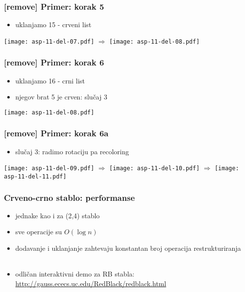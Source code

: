 \documentclass[compress,aspectratio=169]{beamer}
\begin{document}
\begin{frame}[fragile]
  \frametitle{[remove] Primer: korak 5}
  \begin{itemize}
    \item uklanjamo 15 - crveni list
  \end{itemize}
  \begin{center}
    \texttt{[image: asp-11-del-07.pdf]} $\Rightarrow$
    \texttt{[image: asp-11-del-08.pdf]}
  \end{center}
\end{frame}

\begin{frame}[fragile]
  \frametitle{[remove] Primer: korak 6}
  \begin{itemize}
    \item uklanjamo 16 - crni list
    \item njegov brat 5 je crven: slučaj 3
  \end{itemize}
  \begin{center}
    \texttt{[image: asp-11-del-08.pdf]}
  \end{center}
\end{frame}

\begin{frame}[fragile]
  \frametitle{[remove] Primer: korak 6a}
  \begin{itemize}
    \item slučaj 3: radimo rotaciju pa recoloring
  \end{itemize}
  \begin{center}
    \texttt{[image: asp-11-del-09.pdf]} $\Rightarrow$
    \texttt{[image: asp-11-del-10.pdf]} $\Rightarrow$
    \texttt{[image: asp-11-del-11.pdf]}
  \end{center}
\end{frame}

\begin{frame}[fragile]
  \frametitle{Crveno-crno stablo: performanse}
  \begin{itemize}
    \item jednake kao i za (2,4) stablo
    \item sve operacije su $O(\log n)$ 
    \item dodavanje i uklanjanje zahtevaju konstantan broj operacija restrukturiranja \\ \ \\
    \item odličan interaktivni demo za RB stabla: \\
    \url{http://gauss.ececs.uc.edu/RedBlack/redblack.html}
  \end{itemize}
\end{frame}
\end{document}
